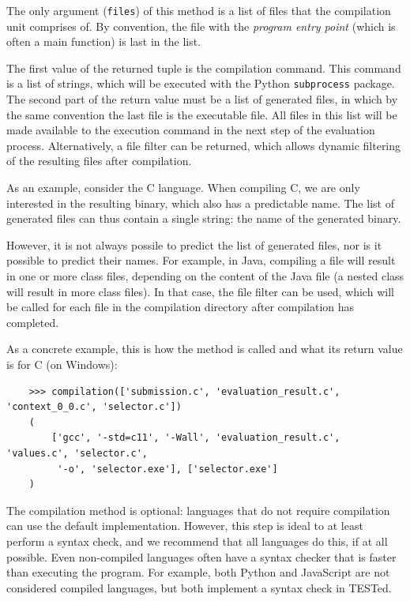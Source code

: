 \documentclass[../main]{subfiles}
\begin{document}
The only argument (\texttt{files}) of this method is a list of files that the compilation unit comprises of.
By convention, the file with the \emph{program entry point} (which is often a main function) is last in the list.

The first value of the returned tuple is the compilation command.
This command is a list of strings, which will be executed with the Python \texttt{subprocess} package.
The second part of the return value must be a list of generated files, in which by the same convention the last file is the executable file.
All files in this list will be made available to the execution command in the next step of the evaluation process.
Alternatively, a file filter can be returned, which allows dynamic filtering of the resulting files after compilation.

As an example, consider the C language.
When compiling C, we are only interested in the resulting binary, which also has a predictable name.
The list of generated files can thus contain a single string: the name of the generated binary.

However, it is not always possile to predict the list of generated files, nor is it possible to predict their names.
For example, in Java, compiling a file will result in one or more class files, depending on the content of the Java file (a nested class will result in more class files).
In that case, the file filter can be used, which will be called for each file in the compilation directory after compilation has completed.

As a concrete example, this is how the method is called and what its return value is for C (on Windows):

\begin{verbatim}
    >>> compilation(['submission.c', 'evaluation_result.c', 'context_0_0.c', 'selector.c'])
    (
        ['gcc', '-std=c11', '-Wall', 'evaluation_result.c', 'values.c', 'selector.c',
         '-o', 'selector.exe'], ['selector.exe']
    )
\end{verbatim}

The compilation method is optional: languages that do not require compilation can use the default implementation.
However, this step is ideal to at least perform a syntax check, and we recommend that all languages do this, if at all possible.
Even non-compiled languages often have a syntax checker that is faster than executing the program.
For example, both Python and JavaScript are not considered compiled languages, but both implement a syntax check in TESTed.
\end{document}
